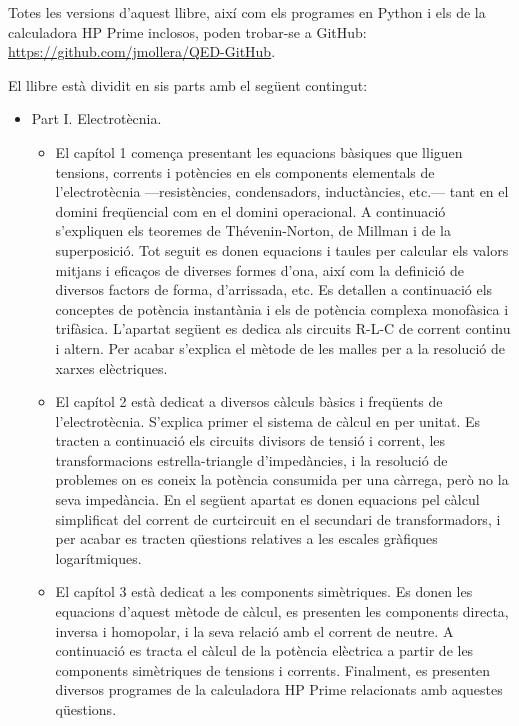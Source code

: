      Totes les versions d'aquest llibre, així com els programes en Python i els de la calculadora \textsf{HP Prime} inclosos, poden trobar-se a GitHub: \href{https://github.com/jmollera/QED-GitHub}{https://github.com/jmollera/QED-GitHub}.

	El llibre està dividit en sis parts amb el següent contingut:
	\begin{itemize}
		\item Part I. Electrotècnia. 
		\begin{itemize}
			\item El capítol 1 comença presentant les equacions bàsiques que lliguen tensions, corrents i potències en els components elementals de l'electrotècnia ---resistències, condensadors, inductàncies, etc.--- tant en el domini freqüencial com en el domini operacional. A continuació s'expliquen els teoremes de Thévenin-Norton, de Millman i de la superposició. Tot seguit es donen equacions i taules per calcular els valors mitjans i eficaços de diverses formes d'ona, així com la definició de diversos factors de forma, d'arrissada, etc. Es detallen a continuació els conceptes de potència instantània i els de potència complexa monofàsica i trifàsica. L'apartat següent es dedica  als circuits R-L-C de corrent continu i altern. Per acabar s'explica el mètode de les malles per a la resolució de xarxes elèctriques.
			\item El capítol 2 està dedicat a diversos càlculs bàsics i freqüents de l'electrotècnia. S'explica primer el sistema de càlcul en per unitat. Es tracten a continuació els circuits  divisors de tensió i corrent,  les transformacions estrella-triangle d'impedàncies, i la resolució de problemes on es coneix la potència consumida per una càrrega, però no la seva impedància. En el següent apartat es donen equacions pel càlcul simplificat del corrent de curtcircuit en el secundari de transformadors, i per acabar es tracten  qüestions relatives a les  escales gràfiques logarítmiques.
			\item El capítol 3 està dedicat a les components simètriques. Es donen les equacions d'aquest mètode de càlcul, es presenten les components directa, inversa i homopolar, i la seva relació amb el corrent de neutre. A continuació es tracta el càlcul de la potència elèctrica a partir de les components simètriques de tensions i corrents. Finalment, es presenten diversos programes de la calculadora \textsf{HP Prime} relacionats amb aquestes qüestions.

\end{itemize}
\end{itemize}
